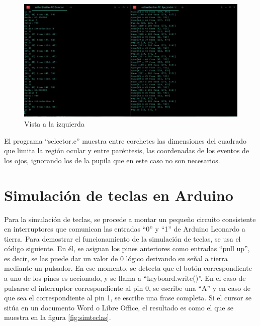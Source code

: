     \begin{figure}
    \centering
    \includegraphics[scale = 0.4]{capitulo_04/figuras_dir/ldizq.jpg}
    \caption{Vista a la izquierda}
    \end{figure}


El programa ``selector.c'' muestra entre corchetes las dimensiones del cuadrado que limita la región ocular y entre paréntesis, las coordenadas de los eventos de los ojos, ignorando los de la pupila que en este caso no son necesarios. 


\section{Simulación de teclas en Arduino} \label{s4_6}

Para la simulación de teclas, se procede a montar un pequeño circuito consistente en interruptores que comunican las entradas ``0'' y ``1'' de Arduino Leonardo a tierra. Para demostrar el funcionamiento de la simulación de teclas, se usa el código siguiente. En él, se asignan los pines anteriores como entradas ``pull up'', es decir, se las puede dar un valor de 0 lógico derivando su señal a tierra mediante un pulsador. En ese momento, se detecta que el botón correspondiente a uno de los pines es accionado, y se llama a ``keyboard.write()''. En el caso de pulsarse el interruptor correspondiente al pin 0, se escribe una ``A'' y en caso de que sea el correspondiente al pin 1, se escribe una frase completa. Si el cursor se sitúa en un documento Word o Libre Office, el resultado es como el que se muestra en la figura \ref{fig:simteclas}.



